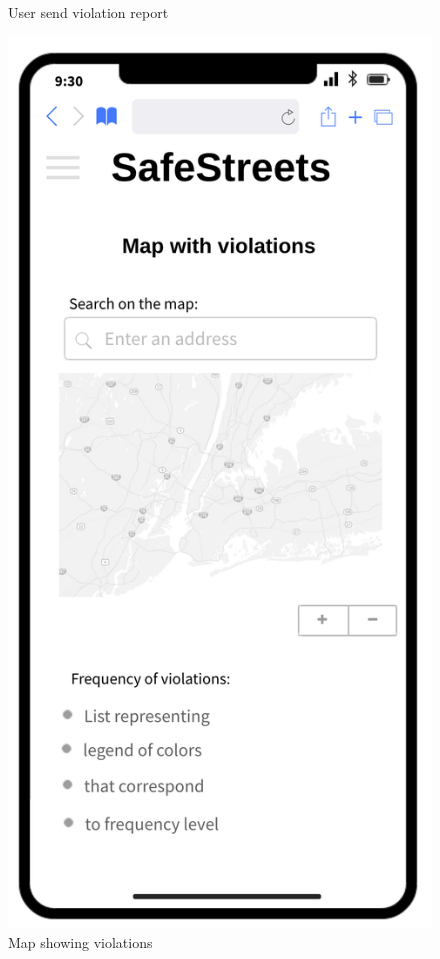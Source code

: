 \begin{figure}[H]
\begin{minipage}[b]{0.40\textwidth}
			\caption{User send violation report}
		\end{minipage}
		\hfill
		\begin{minipage}[b]{0.4\textwidth}
			\includegraphics[width=\textwidth]{Images/rasd-mocks/violationsMap.png}
			\caption{Map showing violations}
		\end{minipage}
	\end{figure}

